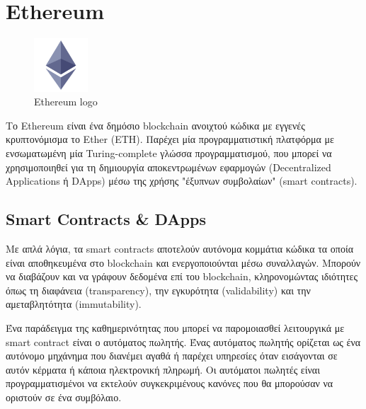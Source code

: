 \section{Ethereum}

\begin{figure}[H]
	\centering
	\includegraphics[width=2cm]{assets/figures/ethereum-logo.png}
	\caption{Ethereum logo}
\end{figure}

Το Ethereum είναι ένα δημόσιο blockchain ανοιχτού κώδικα με εγγενές κρυπτονόμισμα το Ether (ETH). Παρέχει μία προγραμματιστική πλατφόρμα με ενσωματωμένη μία Turing-complete γλώσσα προγραμματισμού, που μπορεί να χρησιμοποιηθεί για τη δημιουργία αποκεντρωμένων εφαρμογών (Decentralized Applications ή DApps) μέσω της χρήσης "έξυπνων συμβολαίων" (smart contracts).\cite{2.6-ethereum-whitepaper}

\subsection{Smart Contracts \& DApps}
Με απλά λόγια, τα smart contracts αποτελούν αυτόνομα κομμάτια κώδικα τα οποία είναι αποθηκευμένα στο blockchain και ενεργοποιούνται μέσω συναλλαγών. Μπορούν να διαβάζουν και να γράφουν δεδομένα επί του blockchain, κληρονομώντας ιδιότητες όπως τη διαφάνεια (transparency), την εγκυρότητα (validability) και την αμεταβλητότητα (immutability).

Ένα παράδειγμα της καθημερινότητας που μπορεί να παρομοιασθεί λειτουργικά με smart contract είναι ο αυτόματος πωλητής\cite{2.6-ethereum-smart-contracts}. Ένας αυτόματος πωλητής ορίζεται ως ένα αυτόνομο μηχάνημα που διανέμει αγαθά ή παρέχει υπηρεσίες όταν εισάγονται σε αυτόν κέρματα ή κάποια ηλεκτρονική πληρωμή. Οι αυτόματοι πωλητές είναι προγραμματισμένοι να εκτελούν συγκεκριμένους κανόνες που θα μπορούσαν να οριστούν σε ένα συμβόλαιο.

